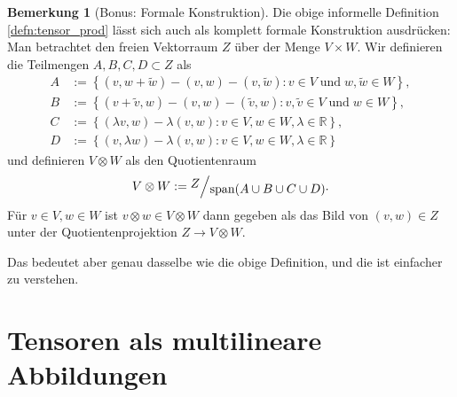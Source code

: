 \documentclass[a4paper]{scrreprt}
\numberwithin{equation}{chapter}
\newcommand{\R}{\mathbb{R}}
\theoremstyle{definition}
\newtheorem{bem}[defn]{Bemerkung}
\begin{document}
\begin{bem}[Bonus: Formale Konstruktion]
	Die obige informelle Definition \ref{defn:tensor_prod} lässt sich auch als komplett formale Konstruktion ausdrücken: Man betrachtet den freien Vektorraum $Z$ über der Menge $V\times W$. Wir definieren die Teilmengen $A,B,C,D \subset Z$ als
	\begin{align*}
		A &:= \left\{(v,w+\tilde w) - (v,w) - (v,\tilde w): v\in V \; \text{und} \; w, \tilde w \in W\right\},\\
		B &:= \left\{(v+\tilde v,w) - (v,w) - (\tilde v,w): v,\tilde v\in V \; \text{und} \; w\in W\right\},\\
		C &:= \left\{(\lambda v,w) - \lambda(v,w): v\in V, w \in W, \lambda\in\R\right\},\\
		D &:= \left\{(v,\lambda w) - \lambda(v,w): v\in V, w \in W, \lambda\in\R\right\}
	\end{align*}
	und definieren $V\otimes W$ als den Quotientenraum
	\[V\otimes W := \raise0.5ex\hbox{$Z$} \Big/ \lower0.5ex\hbox{$\mathrm{span}(A\cup B\cup C\cup D)$}.\]
	Für $v\in V, w\in W$ ist $v\otimes w \in V\otimes W$ dann gegeben als das Bild von $(v,w) \in Z$ unter der Quotientenprojektion $Z\to V\otimes W$.

	Das bedeutet aber genau dasselbe wie die obige Definition, und die ist einfacher zu verstehen.
\end{bem}

\section{Tensoren als multilineare Abbildungen}
\end{document}
